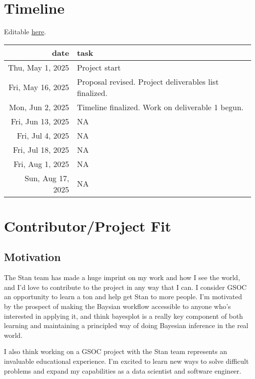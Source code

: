 \documentclass[
  letterpaper,
  DIV=11,
  numbers=noendperiod]{scrartcl}
\begin{document}
\section{Timeline}\label{timeline}

Editable
\href{https://docs.google.com/spreadsheets/d/1llapJAsr9QqkNebSWEMnm0b4QB_sRLwOjwWQdF92Kak/edit?gid=0\#gid=0}{here}.

\begin{table}
\fontsize{12.0pt}{14.4pt}\selectfont
\begin{tabular*}{\linewidth}{@{\extracolsep{\fill}}rl}
\toprule
date & task \\ 
\midrule\addlinespace[2.5pt]
Thu, May 1, 2025 & Project start \\ 
Fri, May 16, 2025 & Proposal revised. Project deliverables list finalized. \\ 
Mon, Jun 2, 2025 & Timeline finalized. Work on deliverable 1 begun. \\ 
Fri, Jun 13, 2025 & NA \\ 
Fri, Jul 4, 2025 & NA \\ 
Fri, Jul 18, 2025 & NA \\ 
Fri, Aug 1, 2025 & NA \\ 
Sun, Aug 17, 2025 & NA \\ 
\bottomrule
\end{tabular*}
\end{table}

\section{Contributor/Project Fit}\label{contributorproject-fit}

\subsection{Motivation}\label{motivation}

The Stan team has made a huge imprint on my work and how I see the
world, and I'd love to contribute to the project in any way that I can.
I consider GSOC an opportunity to learn a ton and help get Stan to more
people. I'm motivated by the prospect of making the Baysian workflow
accessible to anyone who's interested in applying it, and think
bayesplot is a really key component of both learning and maintaining a
principled way of doing Bayesian inference in the real world.

I also think working on a GSOC project with the Stan team represents an
invaluable educational experience. I'm excited to learn new ways to
solve difficult problems and expand my capabilities as a data scientist
and software engineer.
\end{document}
